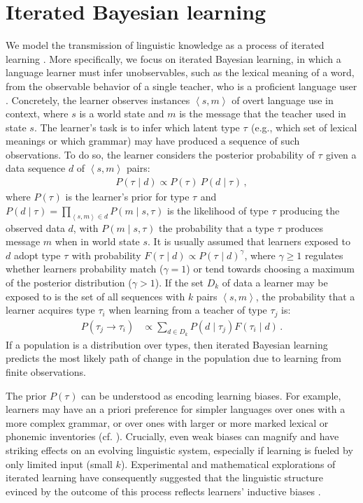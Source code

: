 \documentclass[10pt,a4paper]{article}
\newcommand{\tuple}[1]{\ensuremath{\left\langle #1 \right\rangle}}
\newcommand{\type}[1]{\ensuremath{\tau_{#1}}}
\newcommand{\postparameter}{\ensuremath{\gamma}}
\begin{document}
\section{Iterated Bayesian learning}

We model the transmission of linguistic knowledge as a process of iterated learning \citep{kirby+etal:2014, tamariz+kirby:2016}.
More specifically, we focus on
iterated Bayesian learning, in which a language learner must infer unobservables, such as the
lexical meaning of a word, from the observable behavior of a single teacher, who is a
proficient language user \citep[e.g.][]{griffiths+kalish:2007,kirby+etal:2007}. Concretely, the
learner observes instances $\tuple{s,m}$ of overt language use in context, where $s$ is a world state
and $m$ is the message that the teacher used in state $s$. The learner's task is to infer which
latent type \type{} (e.g., which set of lexical meanings or which grammar) may have produced a
sequence of such observations. To do so, the learner considers the posterior probability of \type{} given a data sequence $d$ of $\tuple{s, m}$ pairs:
\begin{align*}
  P(\type{} \mid d) \propto P(\type{}) \ P(d \mid \type{})\,,
\end{align*}
where $P(\type{})$ is the learner's prior for type \type{} and
$P(d \mid \type{}) = \prod_{\tuple{s,m} \in d} P(m \mid s, \type{})$ is the likelihood of type \type{}
producing the observed data $d$, with $P(m \mid s, \type{})$ the probability that a type \type{} produces
message $m$ when in world state $s$. It is usually assumed that learners exposed to $d$ adopt
type \type{} with probability $F(\type{} \mid d) \propto P(\type{} \mid d)^\postparameter$, where $\postparameter \ge 1$ regulates
whether learners probability match ($\postparameter = 1$) or tend towards choosing a maximum of the
posterior distribution ($\postparameter > 1$). If the set $D_k$ of data a learner may be exposed to is the
set of all sequences with $k$ pairs $\tuple{s,m}$, the probability that a learner acquires type
\type{i} when learning from a teacher of type \type{j} is:
\begin{align*}
  P(\type{j} \rightarrow \type{i}) &\propto \sum_{d \in D_k} P(d \mid \type{j}) F(\type{i} \mid d)\,.
\end{align*}
If a population is a distribution over types, then iterated Bayesian learning predicts the most
likely path of change in the population due to learning from finite observations.

The prior $P(\type{})$ can be understood as encoding learning biases. For example, learners may have
an a priori preference for simpler languages over ones with a more complex grammar, or over
ones with larger or more marked lexical or phonemic inventories
(cf. \citealt{chater+vitanyi:2003, kirby+etal:2015}). Crucially, even weak biases
can magnify and have striking effects on an evolving linguistic system, especially if learning
is fueled by only limited input (small $k$). Experimental and mathematical explorations of
iterated learning have consequently suggested that the linguistic structure evinced by the outcome of this process
reflects learners' inductive biases \citep{kirby+etal:2007,kirby+etal:2014}.
\end{document}
